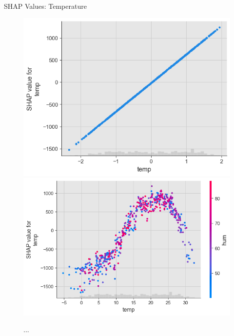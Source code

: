 \documentclass[10pt]{beamer}
\begin{document}
\begin{frame}{SHAP Values: Temperature}
\begin{center}
  \begin{figure}
    \includegraphics[scale=0.33]{images/interpretable_ml_119_0.png}
    \includegraphics[scale=0.33]{images/interpretable_ml_131_0.png}
    \caption{ ... }
  \end{figure}
\end{center}
\end{frame}
\end{document}
